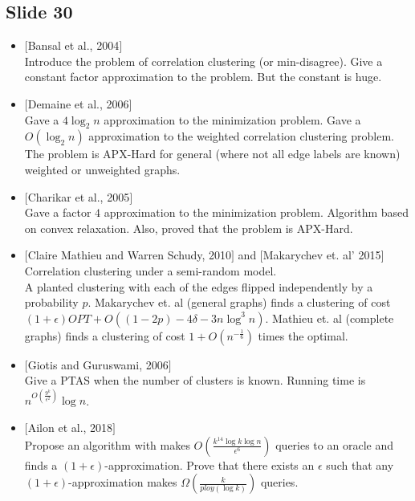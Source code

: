 \documentclass[12pt]{article}
\begin{document}
\subsection*{Slide 30}
\begin{itemize}
	\item $[$Bansal et al., 2004$]$\\
	Introduce the problem of correlation clustering (or min-disagree). Give a constant factor approximation to the problem. But the constant is huge. 
	\item $[$Demaine et al., 2006$]$\\
	Gave a $4\log_2 n$ approximation to the minimization problem. Gave a $O(\log_2 n)$ approximation to the weighted correlation clustering problem. The problem is APX-Hard for general (where not all edge labels are known) weighted or unweighted graphs.
	\item $[$Charikar et al., 2005$]$\\
	Gave a factor $4$ approximation to the minimization problem. Algorithm based on convex relaxation. Also, proved that the problem is APX-Hard. 
	\item $[$Claire Mathieu and Warren Schudy, 2010$]$ and $[$Makarychev et. al' 2015$]$
	Correlation clustering under a semi-random model. \\
	A planted clustering with each of the edges flipped independently by a probability $p$. Makarychev et. al (general graphs) finds a clustering of cost $(1 +\epsilon) OPT +O((1-2p)-4\delta-3n\log^3n)$. Mathieu et. al (complete graphs) finds a clustering of cost $1+O(n^{-\frac{1}{6}})$ times the optimal. 
	\item $[$Giotis and Guruswami, 2006$]$\\
	Give a PTAS when the number of clusters is known. Running time is $n^{O(\frac{9^k}{\epsilon^2})}\log n$.
	
	\item $[$Ailon et al., 2018$]$\\
	Propose an algorithm with makes $O(\frac{k^{14} \log k\log n}{\epsilon^6})$ queries to an oracle and finds a $(1+\epsilon)$-approximation. Prove that there exists an $\epsilon$ such that any $(1+\epsilon)$-approximation makes $\Omega(\frac{k}{ploy(\log k)})$ queries. 
\end{itemize}
\end{document}
